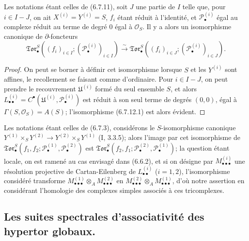 \begin{proposition}[6.7.12]
Les notations étant celles de (6.7.11), soit $J$ une partie de $I$ telle que,
pour $i\in I-J$, on ait $X^{(i)}=Y^{(i)}=S$, $f_i$ étant réduit à l'identité,
et $\mathscr P_\bullet^{(i)}$ égal au complexe réduit au terme de degré $0$
égal à $\mathscr O_S$. Il y a alors un isomorphisme canonique de
$\partial$-foncteurs
\[
  \mathfrak{Tor}_\bullet^S
  ((f_i)_{i\in I};(\mathscr P_\bullet^{(i)})_{i\in I})
  \xrightarrow{\sim}
  \mathfrak{Tor}_\bullet^S
  ((f_i)_{i\in J};(\mathscr P_\bullet^{(i)})_{i\in J}).
  \tag{6.7.12.1}\label{III.6.7.12.1.fr}
\]
\end{proposition}

\begin{proof}
On peut se borner à définir cet isomorphisme lorsque $S$ et les $Y^{(i)}$
sont affines, le recollement se faisant comme d'ordinaire. Pour $i\in I-J$,
on peut prendre le recouvrement $\mathfrak U^{(i)}$ formé du seul ensemble
$S$, et alors
$L_{\bullet\bullet}^{(i)}=C^\bullet(\mathfrak U^{(i)},
\mathscr P_\bullet^{(i)})$ est réduit à son seul terme de degrés $(0,0)$,
égal à $\Gamma(S,\mathscr O_S)=A(S)$; l'isomorphisme (6.7.12.1) est alors
évident.
\end{proof}

\begin{remark}[6.7.13]
Les notations étant celles de (6.7.3), considérons le $S$-isomorphisme
canonique
$Y^{(1)}\times_S Y^{(2)}\to Y^{(2)}\times_S Y^{(1)}$ (I, 3.3.5); alors
l'image par cet isomorphisme de
$\mathfrak{Tor}_\bullet^S(f_1,f_2;
\mathscr P_\bullet^{(1)},\mathscr P_\bullet^{(2)})$ est
$\mathfrak{Tor}_\bullet^S(f_2,f_1;
\mathscr P_\bullet^{(2)},\mathscr P_\bullet^{(1)})$; la question étant
locale, on est ramené au cas envisagé dans (6.6.2), et si on désigne par
$M_{\bullet\bullet\bullet}^{(i)}$ une résolution projective de
Cartan-Eilenberg de $L_{\bullet\bullet}^{(i)}$ ($i=1,2$), l'isomorphisme
considéré transforme
$M_{\bullet\bullet\bullet}^{(1)}\otimes_A
M_{\bullet\bullet\bullet}^{(2)}$ en
$M_{\bullet\bullet\bullet}^{(2)}\otimes_A
M_{\bullet\bullet\bullet}^{(1)}$, d'où notre assertion en considérant
l'homologie des complexes simples associés à ces tricomplexes.
\end{remark}

\subsection{Les suites spectrales d'associativité des hypertor globaux.}

